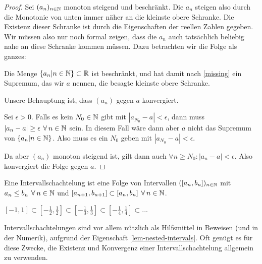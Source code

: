 \begin{proof}
    Sei $(a_n)_{n \in \mathbb{N}}$ monoton steigend und beschränkt. Die $a_n$ steigen also durch die Monotonie von unten immer näher an die kleinste obere Schranke. Die Existenz dieser Schranke ist durch die Eigenschaften der reellen Zahlen gegeben. Wir müssen also nur noch formal zeigen, dass die $a_n$ auch tatsächlich beliebig nahe an diese Schranke kommen müssen. Dazu betrachten wir die Folge als ganzes:

    Die Menge $\{a_n | n \in \mathbb{N}\} \subset \mathbb{R}$ ist beschränkt, und hat damit nach \ref{missing} ein Supremum, das wir $a$ nennen, die besagte kleinste obere Schranke.
    
    Unsere Behauptung ist, dass $(a_n)$ gegen $a$ konvergiert.

    Sei $\epsilon > 0$. Falls es kein $N_0 \in \mathbb{N}$ gibt mit $|a_{N_0} - a| < \epsilon$, dann muss $|a_n - a| \geq \epsilon \forall n \in \N$ sein. In diesem Fall wäre dann aber $a$ nicht das Supremum von $\{a_n | n \in \mathbb{N}\}$. Also muss es ein $N_0$ geben mit $|a_{N_0} - a| < \epsilon$.

    Da aber $(a_n)$ monoton steigend ist, gilt dann auch $\forall n \geq N_0: |a_n - a| < \epsilon$. Also konvergiert die Folge gegen $a$.
\end{proof}

\begin{definition}[Intervallschachtelung]
    Eine Intervallschachtelung ist eine Folge von Intervallen $([a_n, b_n])_{n \in \mathbb{N}}$ mit $a_n \leq b_n \forall n \in \N$ und $[a_{n+1}, b_{n+1}] \subset [a_n, b_n] \forall n \in \N$.
\end{definition}

\begin{example}
    $[-1, 1] \subset [-\frac{1}{2}, \frac{1}{2}] \subset [-\frac{1}{3}, \frac{1}{3}] \subset [-\frac{1}{4}, \frac{1}{4}] \subset ...$
\end{example}

Intervallschachtelungen sind vor allem nützlich als Hilfsmittel in Beweisen (und in der Numerik), aufgrund der Eigenschaft \ref{lem-nested-intervals}. Oft genügt es für diese Zwecke, die Existenz und Konvergenz einer Intervallschachtelung allgemein zu verwenden.

